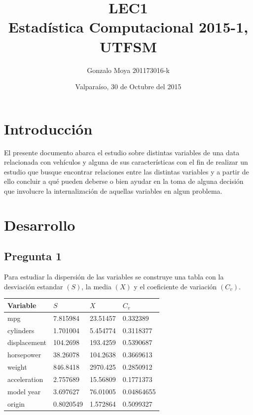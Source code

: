 \documentclass[letter,10pt]{article}
\title{LEC1 \\ Estadística Computacional 2015-1, UTFSM }
\author{Gonzalo Moya 201173016-k}
\date{\vspace*{1cm} Valparaíso, 30 de Octubre del 2015}
\begin{document}
\maketitle
\thispagestyle{empty}
\newpage
\tableofcontents

\makeatother

\newpage

\section{Introducción}
El presente documento abarca el estudio sobre distintas variables de una data relacionada con vehículos y alguna de sus características con el fin de realizar 
un estudio que busque encontrar relaciones entre las distintas variables y a partir de ello concluir a qué pueden deberse o bien ayudar en la toma de alguna decisión 
que involucre la internalización de aquellas variables en algun problema.

\section{Desarrollo}
\subsection{Pregunta 1}

Para estudiar la dispersión de las variables se construye una tabla con la desviación estandar $(S)$, la media $(X)$ y el coeficiente
de variación $(C_v)$.

\begin{table}[h]
    \begin{center}
    \begin{tabular}{|l|l|l|l|}
    \hline
    Variable     & $S$ & $X$ & $C_{v}$ \\ \hline
    mpg          & 7.815984 & 23.51457 & 0.332389 \\
    cylinders    & 1.701004 & 5.454774 & 0.3118377 \\
    displacement & 104.2698 & 193.4259 & 0.5390687 \\
    horsepower   & 38.26078 & 104.2638 & 0.3669613 \\
    weight       & 846.8418 & 2970.425 & 0.2850912 \\
    acceleration & 2.757689 & 15.56809 & 0.1771373 \\
    model year   & 3.697627 & 76.01005 & 0.04864655 \\
    origin       & 0.8020549 & 1.572864 & 0.5099327 \\ \hline
    \end{tabular}
    \end{center}
\end{table}
\end{document}
